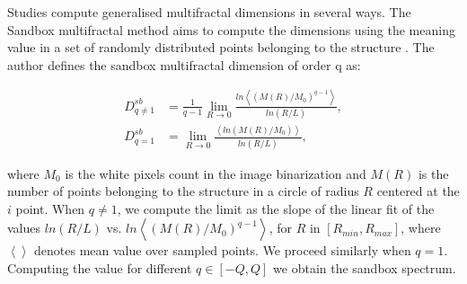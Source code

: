 \documentclass[final,5p,times]{elsarticle}
\begin{document}
{Studies compute generalised multifractal dimensions  in several ways. The Sandbox multifractal method \cite{Tel1989} aims to compute the dimensions using the meaning value in a set of randomly distributed points belonging to the structure \cite{Debartolo2004}. The author defines the sandbox multifractal dimension of order q as:

 \begin{align}
D_{q\ne 1}^{sb} &= \frac{1}{q-1} \lim_{R \rightarrow 0}{
\frac{ln   { \left\langle  (M(R)/M_{0})^{q-1} \right\rangle   }}
{ln {(R/L)}       }},\\
D_{q=1}^{sb} &= \lim_{R \rightarrow 0}{
\frac{ \left\langle ln   { (M(R)/M_{0})  }  \right\rangle}
{ln {(R/L)}       }},
\end{align}

\noindent where $M_{0}$ is the white pixels count in the image binarization and  $M(R)$ is the number of points belonging to the structure in a circle of radius $R$ centered at the $i$ point. When $q\ne1$, we compute the limit as the slope of the linear fit of the values $ln(R/L)$ vs. $ ln  \left\langle  { (M(R)/M_{0})^{q-1}  }  \right\rangle$, for $R$ in $[R_{min}, R_{max}]$, where $ \left\langle   \right\rangle$ denotes mean value over sampled points. We proceed similarly when $q=1$. Computing the value for different $q \in [-Q,Q]$  we obtain the sandbox spectrum.


}
\end{document}
